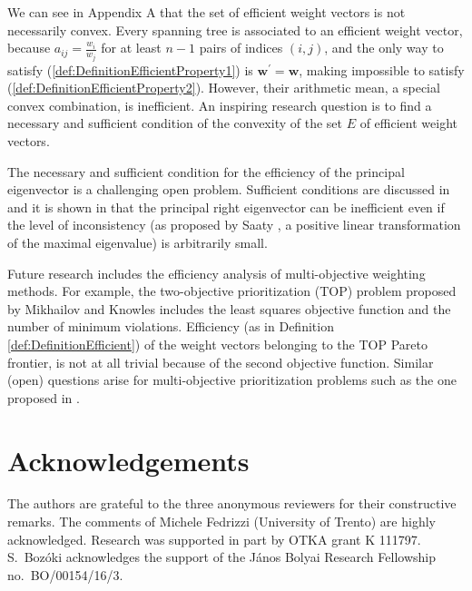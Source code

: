 \documentclass{article}
\theoremstyle{plain}
\begin{document}
We can see in Appendix A that the set of ef{\kern0pt}f{\kern0pt}icient weight vectors is not necessarily convex.
Every spanning tree is associated to an ef{\kern0pt}f{\kern0pt}icient weight vector, because
$a_{ij} = \frac{w_i}{w_j} $ for at least $n-1$ pairs of indices $(i,j)$, and the only
way to satisfy (\ref{def:DefinitionEfficientProperty1}) is $ \mathbf{w^{\prime}} = \mathbf{w}$,
making impossible to satisfy (\ref{def:DefinitionEfficientProperty2}).
However, their arithmetic mean, a special convex combination, is inef{\kern0pt}f{\kern0pt}icient.
An inspiring research question is to f{\kern0pt}ind a necessary and suf{\kern0pt}f{\kern0pt}icient condition of the convexity
of the set $E$ of ef{\kern0pt}f{\kern0pt}icient weight vectors.


The necessary and suf{\kern0pt}f{\kern0pt}icient condition for the ef{\kern0pt}f{\kern0pt}iciency of the principal eigenvector is a challenging open problem.
Suf{\kern0pt}f{\kern0pt}icient conditions are discussed in \cite{Abele-NagyBozoki2016,Abele-NagyBozokiRebak2016} and it is
shown in \cite{Bozoki2014} that the principal right eigenvector can be inef{\kern0pt}f{\kern0pt}icient even if the
level of inconsistency (as proposed by Saaty \cite{Saaty1977}, a positive linear transformation of the maximal eigenvalue)
is arbitrarily small.


Future research includes the ef{\kern0pt}f{\kern0pt}iciency analysis of multi-objective weighting methods.
For example, the two-objective prioritization (TOP) problem proposed by Mikhailov and Knowles \cite{MikhailovKnowles2009}
includes the least squares objective function and the number of minimum violations.
Ef{\kern0pt}f{\kern0pt}iciency (as in Def{\kern0pt}inition \ref{def:DefinitionEfficient}) of the weight vectors belonging to the TOP Pareto frontier,
is not at all trivial because of the second objective function. Similar (open) questions arise for
multi-objective prioritization problems such as the one proposed in \cite{SirajMikhailovKeane2012c}.


\section*{Acknowledgements}
The authors are grateful to the three anonymous reviewers for their constructive remarks.
The comments of Michele Fedrizzi (University of Trento) are highly acknowledged.
Research was supported in part by OTKA grant K 111797.
S.~Boz\'oki acknowledges the support of the J\'anos Bolyai Research Fellowship no.~BO/00154/16/3.
\end{document}
